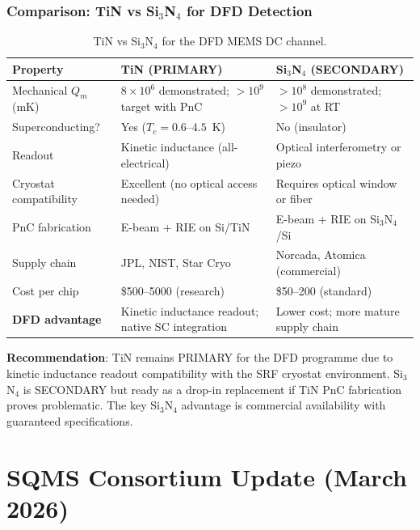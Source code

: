 \documentclass[11pt]{article}
\newcommand{\ee}[1]{\times 10^{#1}}
\theoremstyle{definition}
\theoremstyle{remark}
\begin{document}
\section{Comparison: TiN vs Si$_3$N$_4$ for DFD Detection}

\begin{table}[H]
\centering
\caption{TiN vs Si$_3$N$_4$ for the DFD MEMS DC channel.}
\renewcommand{\arraystretch}{1.3}
\begin{tabular}{@{}p{3.5cm}p{4.5cm}p{4.5cm}@{}}
\toprule
\textbf{Property} & \textbf{TiN (PRIMARY)} & \textbf{Si$_3$N$_4$ (SECONDARY)} \\
\midrule
Mechanical $Q_m$ (mK) & $8\ee{6}$ demonstrated; $>10^9$
  target with PnC & $>10^8$ demonstrated; $>10^9$ at RT \\
Superconducting? & Yes ($T_c = 0.6$--$4.5$~K) & No (insulator) \\
Readout & Kinetic inductance (all-electrical) &
  Optical interferometry or piezo \\
Cryostat compatibility & Excellent (no optical access needed) &
  Requires optical window or fiber \\
PnC fabrication & E-beam + RIE on Si/TiN & E-beam + RIE on
  Si$_3$N$_4$/Si \\
Supply chain & JPL, NIST, Star Cryo & Norcada, Atomica (commercial) \\
Cost per chip & \$500--5000 (research) & \$50--200 (standard) \\
\textbf{DFD advantage} & Kinetic inductance readout; native
  SC integration & Lower cost; more mature supply chain \\
\bottomrule
\end{tabular}
\end{table}

\textbf{Recommendation}: TiN remains PRIMARY for the DFD programme
due to kinetic inductance readout compatibility with the SRF cryostat
environment. Si$_3$N$_4$ is SECONDARY but ready as a drop-in
replacement if TiN PnC fabrication proves problematic. The key
Si$_3$N$_4$ advantage is commercial availability with guaranteed
specifications.


\part{SQMS Consortium Update (March 2026)}
\label{part:sqms_update}
\end{document}
